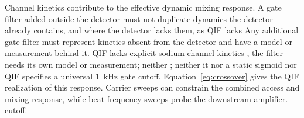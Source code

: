 \documentclass[11pt,a4paper]{article}
\providecommand{\DIFaddtex}[1]{{\protect\color{blue} \sf #1}} %
\providecommand{\DIFdeltex}[1]{{\protect\color{red} \scriptsize #1}} %
\providecommand{\DIFaddbegin}{} %
\providecommand{\DIFaddend}{} %
\providecommand{\DIFdelbegin}{} %
\providecommand{\DIFdelend}{} %
\providecommand{\DIFadd}[1]{\texorpdfstring{\DIFaddtex{#1}}{#1}} %
\providecommand{\DIFdel}[1]{\texorpdfstring{\DIFdeltex{#1}}{}} %
\begin{document}
\DIFdelbegin \DIFdel{Channel kinetics contribute to the effective dynamic mixing response. A gate filter added outside the detector must not duplicate dynamics the detector
already
contains, and where the detector lacks them, as QIF lacks }\DIFdelend \DIFaddbegin \DIFadd{Any additional gate filter must represent kinetics absent from the detector
and have a model or measurement behind it. QIF lacks explicit }\DIFaddend sodium-channel
kinetics\DIFdelbegin \DIFdel{,
the filter needs its own model or measurement; neither }\DIFdelend \DIFaddbegin \DIFadd{; neither it nor }\DIFaddend a static sigmoid \DIFdelbegin \DIFdel{nor QIF
}\DIFdelend specifies a universal $1$~kHz \DIFdelbegin \DIFdel{gate cutoff.
Equation~\eqref{eq:crossover} gives the QIF realization of this response.
Carrier sweeps can constrain the
combined access and mixing response, while beat-frequency sweeps probe the
downstream amplifier. }\DIFdelend \DIFaddbegin \DIFadd{cutoff.
}\DIFaddend
\end{document}
